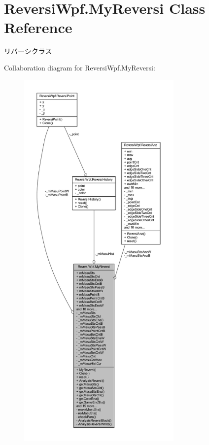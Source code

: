 \hypertarget{class_reversi_wpf_1_1_my_reversi}{}\section{Reversi\+Wpf.\+My\+Reversi Class Reference}
\label{class_reversi_wpf_1_1_my_reversi}


リバーシクラス  




Collaboration diagram for Reversi\+Wpf.\+My\+Reversi\+:\nopagebreak
\begin{figure}[H]
\begin{center}
\leavevmode
\includegraphics[height=550pt]{class_reversi_wpf_1_1_my_reversi__coll__graph}
\end{center}
\end{figure}
